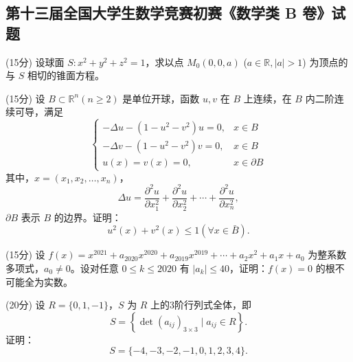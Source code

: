 \documentclass[loose]{ExBook}
\begin{document}
\subsection{第十三届全国大学生数学竞赛初赛《数学类 B 卷》试题}
\begin{qitems}
    \begin{bbox}
        \qitem (15分) 设球面 \( S: x^2 + y^2 + z^2 = 1 \)，求以点 \( M_0(0,0,a) \) (\( a \in \mathbb{R}, |a| > 1 \)) 为顶点的与 \( S \) 相切的锥面方程。
    \end{bbox}

    \begin{bbox}
        \qitem (15分) 设 \( B \subset \mathbb{R}^n (n \geq 2) \) 是单位开球，函数 \( u,v \) 在 \( B \) 上连续，在 \( B \) 内二阶连续可导，满足
        \[
        \begin{cases}
        -\Delta u - \left( 1 - u^2 - v^2 \right) u = 0, & x \in B \\
        -\Delta v - \left( 1 - u^2 - v^2 \right) v = 0, & x \in B \\
        u(x) = v(x) = 0, & x \in \partial B
        \end{cases}
        \]
        其中，\( x = (x_1,x_2,\ldots,x_n) \)，
        \[
        \Delta u = \frac{\partial^2 u}{\partial x_1^2} + \frac{\partial^2 u}{\partial x_2^2} + \cdots + \frac{\partial^2 u}{\partial x_n^2},
        \]
        \(\partial B\) 表示 \( B \) 的边界。证明：
        \[
        u^2(x) + v^2(x) \leq 1 (\forall x \in \bar{B}).
        \]
    \end{bbox}

    \begin{bbox}
        \qitem (15分) 设 \( f(x) = x^{2021} + a_{2020}x^{2020} + a_{2019}x^{2019} + \cdots + a_2x^2 + a_1x + a_0 \) 为整系数多项式，\( a_0 \neq 0 \)。设对任意 \( 0 \leq k \leq 2020 \) 有 \( |a_k| \leq 40 \)，证明：\( f(x) = 0 \) 的根不可能全为实数。
    \end{bbox}

    \begin{bbox}
        \qitem (20分) 设 \( R = \{0,1,-1\} \)，\( S \) 为 \( R \) 上的3阶行列式全体，即 
        \[
        S = \left\{ \det(a_{ij})_{3 \times 3} \mid a_{ij} \in R \right\}.
        \]
        证明：
        \[
        S = \{-4,-3,-2,-1,0,1,2,3,4\}.
        \]
    \end{bbox}


\end{qitems}
\end{document}

